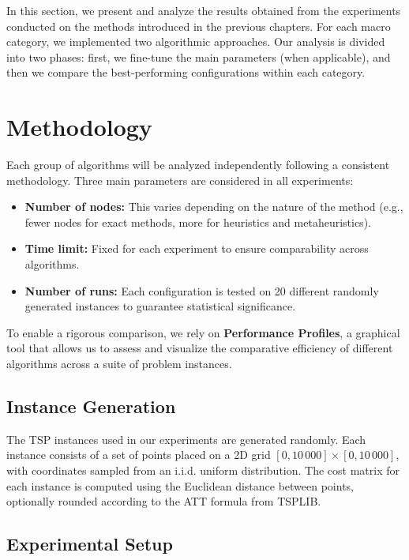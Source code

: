 In this section, we present and analyze the results obtained from the experiments conducted on the methods introduced in the previous chapters. For each macro category, we implemented two algorithmic approaches. Our analysis is divided into two phases: first, we fine-tune the main parameters (when applicable), and then we compare the best-performing configurations within each category.

\section{Methodology}

Each group of algorithms will be analyzed independently following a consistent methodology. Three main parameters are considered in all experiments:
\begin{itemize}
    \item \textbf{Number of nodes:} This varies depending on the nature of the method (e.g., fewer nodes for exact methods, more for heuristics and metaheuristics).
    \item \textbf{Time limit:} Fixed for each experiment to ensure comparability across algorithms.
    \item \textbf{Number of runs:} Each configuration is tested on 20 different randomly generated instances to guarantee statistical significance.
\end{itemize}

To enable a rigorous comparison, we rely on \textbf{Performance Profiles}, a graphical tool that allows us to assess and visualize the comparative efficiency of different algorithms across a suite of problem instances.

\subsection{Instance Generation}

The TSP instances used in our experiments are generated randomly. Each instance consists of a set of points placed on a 2D grid $[0, 10\,000] \times [0, 10\,000]$, with coordinates sampled from an i.i.d. uniform distribution. The cost matrix for each instance is computed using the Euclidean distance between points, optionally rounded according to the ATT formula from TSPLIB.

\subsection{Experimental Setup}

